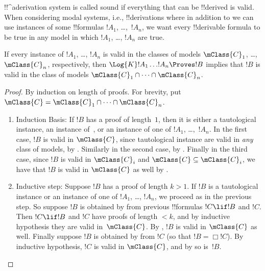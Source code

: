 \documentclass[../../../include/open-logic-section]{subfiles}
\begin{document}

!!^a{derivation} system is called sound if everything that can be
!!{derive}d is valid. When considering modal systems, i.e.,
!!{derivation}s where in addition to  we can use instances of
some !!{formula}s $!A_1$, \dots,~$!A_n$, we want every !!{derivable}
formula to be true in any model in which $!A_1$, \dots, $!A_n$ are
true.  

\begin{thm}
  If every instance of $!A_1$, \dots, $!A_n$ is valid in the
  classes of models $\mClass{C}_1$, \dots, $\mClass{C}_n$,
  respectively, then $\Log{K}!A_1\dots !A_n
  \Proves !B$ implies that $!B$ is valid in the class of
  models $\mClass{C}_1 \cap \dots \cap \mClass{C}_n$.
\end{thm}

\begin{proof}
  By induction on length of proofs. For brevity, put $\mClass{C} =
  \mClass{C}_1 \cap \dots \cap \mClass{C}_n$.
  \begin{enumerate}
  \item Induction Basis: If $!B$ has a proof of length~$1$, then it is
    either a tautological instance, an instance
    of~, or an instance of
    one of $!A_1$, \dots,~$!A_n$. In the first case, $!B$ is valid in
    $\mClass{C}$, since tautological instance are valid in \emph{any}
    class of models, by . Similarly
    in the second case, by
    . Finally in the third case,
    since $!B$ is valid in $\mClass{C}_i$ and $\mClass{C} \subseteq
    \mClass{C}_i$, we have that $!B$ is valid in $\mClass{C}$ as well
    by .
  \item Inductive step: Suppose $!B$ has a proof of length $k>1$. If
    $!B$ is a tautological instance or an instance of one of $!A_1$,
    \dots, $!A_n$, we proceed as in the previous step. So suppose $!B$ is
    obtained by \MP{} from previous !!{formula}s $!C \lif !B$ and
    $!C$. Then $!C \lif !B$ and $!C$ have proofs of length $<k$, and
    by inductive hypothesis they are valid in~$\mClass{C}$. By
    , $!B$ is valid in $\mClass{C}$ as
    well. Finally suppose $!B$ is obtained by \Nec{} from $!C$ (so
    that $!B = \Box!C$). By inductive hypothesis, $!C$ is valid in
    $\mClass{C}$, and by  so is~$!B$.
  \end{enumerate}
\end{proof}
\end{document}
